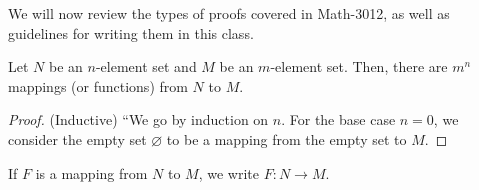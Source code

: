 
We will now review the types of proofs covered in Math-3012, as well as guidelines for writing them in this class.

\begin{prop}
	Let \( N \) be an \( n \)-element set and \( M \) be an \( m \)-element set. Then, there are \( m^n \) mappings (or functions) from \( N \) to \( M \).
\end{prop}
\begin{proof}
	(Inductive) ``We go by induction on \( n \). For the base case \( n=0 \), we consider the empty set \( \varnothing \) to be a mapping from the empty set to \( M \).
\end{proof}

\begin{notation}
	If \( F \) is a mapping from \( N \) to \( M \), we write \( F: N \to M \).
\end{notation}
